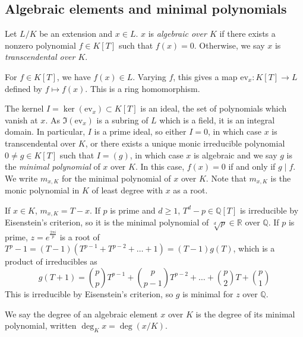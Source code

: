 \subsection{Algebraic elements and minimal polynomials}
\begin{definition}
	Let \( L / K \) be an extension and \( x \in L \).
	\( x \) is \emph{algebraic over \( K \)} if there exists a nonzero polynomial \( f \in K[T] \) such that \( f(x) = 0 \).
	Otherwise, we say \( x \) is \emph{transcendental over \( K \)}.
\end{definition}
For \( f \in K[T] \), we have \( f(x) \in L \).
Varying \( f \), this gives a map \( \mathrm{ev}_x \colon K[T] \to L \) defined by \( f \mapsto f(x) \).
This is a ring homomorphism.

The kernel \( I = \ker(\mathrm{ev}_x) \subset K[T] \) is an ideal, the set of polynomials which vanish at \( x \).
As \( \Im(\mathrm{ev}_x) \) is a subring of \( L \) which is a field, it is an integral domain.
In particular, \( I \) is a prime ideal, so either \( I = 0 \), in which case \( x \) is transcendental over \( K \), or there exists a unique monic irreducible polynomial \( 0 \neq g \in K[T] \) such that \( I = (g) \), in which case \( x \) is algebraic and we say \( g \) is the \emph{minimal polynomial} of \( x \) over \( K \).
In this case, \( f(x) = 0 \) if and only if \( g \mid f \).
We write \( m_{x,K} \) for the minimal polynomial of \( x \) over \( K \).
Note that \( m_{x,K} \) is the monic polynomial in \( K \) of least degree with \( x \) as a root.

\begin{example}
	If \( x \in K \), \( m_{x,K} = T - x \).
	If \( p \) is prime and \( d \geq 1 \), \( T^d - p \in \mathbb Q[T] \) is irreducible by Eisenstein's criterion, so it is the minimal polynomial of \( \sqrt[d]{p} \in \mathbb R \) over \( \mathbb Q \).
	If \( p \) is prime, \( z = e^{\frac{2\pi i}{p}} \) is a root of \( T^p - 1 = (T-1)(T^{p-1} + T^{p-2} + \dots + 1) = (T-1)g(T) \), which is a product of irreducibles as
	\[ g(T+1) = \binom p p T^{p-1} + \binom p {p-1} T^{p-2} + \dots + \binom p 2 T + \binom p 1 \]
	This is irreducible by Eisenstein's criterion, so \( g \) is minimal for \( z \) over \( \mathbb Q \).
\end{example}

We say the degree of an algebraic element \( x \) over \( K \) is the degree of its minimal polynomial, written \( \deg_K x = \deg(x/K) \).

